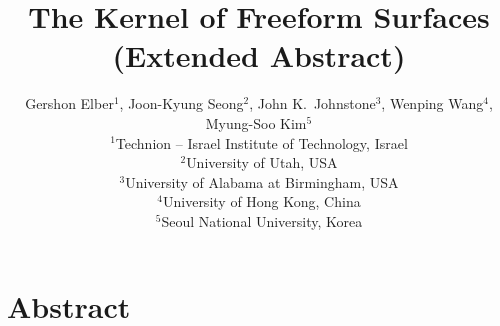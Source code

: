 \documentclass{acmsiggraph}
\begin{document}
\newenvironment{notepar}{\par\smallskip\noindent{}\
\ignorespaces}{\stopproof\ignorespaces\bigbreak}

\newcommand{\CH}{{\cal C}{\cal H}}
\newcommand{\inner}[2]{\left<{#1}, {#2} \right>}

\def\stopproof{\qquad\square}
\def\square{\vbox{\hrule height.2pt\hbox{\vrule width.2pt height5pt
\kern5pt \vrule width.2pt} \hrule height.2pt}}

\newcommand{\Comment}[1]{\relax}  %
\newcommand{\QED}{\vrule height 1.4ex width 1.0ex depth -.1ex\ \vspace{.3in}} %
\newcommand{\lyne}[1]{\mbox{$\stackrel{\textstyle \leftrightarrow}{#1}$}}
\newcommand{\seg}[1]{\mbox{$\overline{#1}$}}
\newcommand{\prf}{\noindent{{\bf Proof}:\ \ \ }}
\newcommand{\choice}[2]{\mbox{\footnotesize{$\left( \begin{array}{c} #1 \\ #2 \end{array} \right)$}}}      
\newcommand{\scriptchoice}[2]{\mbox{\scriptsize{$\left( \begin{array}{c} #1 \\ #2 \end{array} \right)$}}}
\newcommand{\tinychoice}[2]{\mbox{\tiny{$\left( \begin{array}{c} #1 \\ #2 \end{array} \right)$}}}


\title{The Kernel of Freeform Surfaces\\[-0.07in]
{\normalsize (Extended Abstract)}}

\author{Gershon Elber$^1$, Joon-Kyung Seong$^2$, John K.~Johnstone$^3$, 
Wenping Wang$^4$, Myung-Soo Kim$^5$\\
$^1$Technion -- Israel Institute of Technology, Israel\\
$^2$University of Utah, USA\\
$^3$University of Alabama at Birmingham, USA\\
$^4$University of Hong Kong, China\\
$^5$Seoul National University, Korea}

\maketitle

\section*{Abstract}
\end{document}
